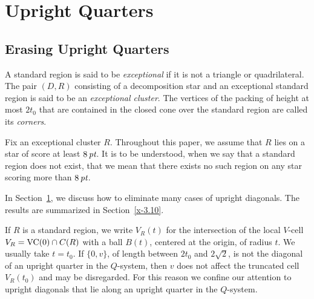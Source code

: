 




\chapter{Upright Quarters}
    \label{sec:upright}

\section{Erasing Upright Quarters}

\begin{definition}
A standard region is said to be {\it exceptional\/} if it is not a
triangle or quadrilateral.  The pair $(D,R)$ consisting of a
decomposition star and an exceptional standard region is said to
be an {\it exceptional cluster}.  The vertices of the packing of
height at most $2t_0$ that are contained in the closed cone over
the standard region are called its {\it corners}.
\end{definition}

Fix an exceptional cluster $R$. Throughout this paper, we assume
that $R$ lies on a star of score at least $8\,\hbox{\it pt}$. It is to be
understood, when we say that a standard region does not exist, that
we mean that there exists no such region on any star scoring more
than $8\,\hbox{\it pt}$.

In Section~\ref{sec:upright}, we discuss how to eliminate many
cases of upright diagonals. The results are summarized in
Section~\ref{x-3.10}.

If $R$ is a standard region, we write $V_R(t)$ for the
intersection of the local $V$-cell $V_R = {\operatorname{VC}}(0)\cap C(R)$
with a ball $B(t)$, centered at the origin, of radius $t$.  We
usually take $t=t_0$. If $\{0,v\}$, of length between $2t_0$ and
$2\sqrt{2}$, is not the diagonal of an upright quarter in the
$Q$-system, then $v$ does not affect the truncated cell $V_R(t_0)$
and may be disregarded. For this reason we confine our attention
to upright diagonals that lie along an upright quarter in the
$Q$-system.


